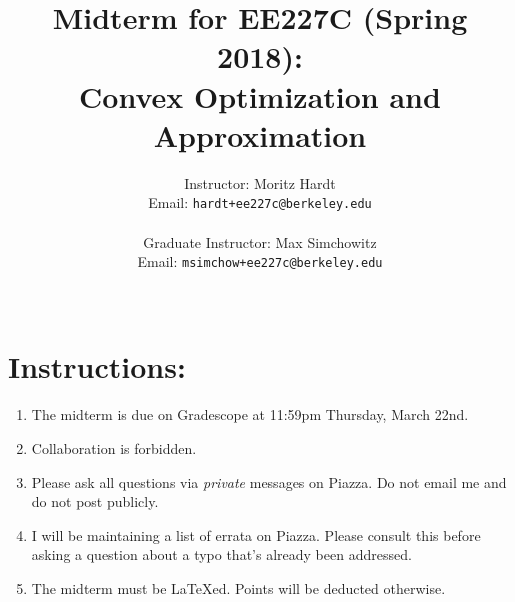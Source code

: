 \documentclass[12pt]{article}
\title{Midterm for EE227C (Spring 2018):\\
 Convex Optimization and Approximation }
\author{Instructor: Moritz Hardt\\
{\small Email: \tt hardt+ee227c@berkeley.edu}\\ ~\\
Graduate Instructor: Max Simchowitz\\
{\small Email: \tt msimchow+ee227c@berkeley.edu}\\ ~\\
}
\begin{document}




\maketitle

\section*{Instructions:}
\begin{enumerate}
	\item The midterm is due on Gradescope at 11:59pm Thursday, March 22nd.
	\item Collaboration is forbidden. 
	\item Please ask all questions via \emph{private} messages on Piazza. Do not email me and do not post publicly. 
	\item I will be maintaining a list of errata on Piazza. Please consult this before asking a question about a typo that's already been addressed.
	\item The midterm must be LaTeXed. Points will be deducted otherwise. 
\end{enumerate}
\end{document}
